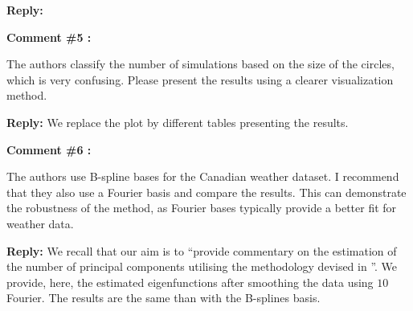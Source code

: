 \documentclass[11pt]{article}
\begin{document}
\medskip

\normalfont

\textbf{Reply:}



\bigskip

\itshape



\textbf{Comment \#5 :}

The authors classify the number of simulations based on the size of the circles, which is very confusing. Please present the results using a clearer visualization method.

\medskip

\normalfont

\textbf{Reply:} We replace the plot by different tables presenting the results.


\bigskip


\itshape

\textbf{Comment \#6 :}

The authors use B-spline bases for the Canadian weather dataset. I recommend that they also use a Fourier basis and compare the results. This can demonstrate the robustness of the method, as Fourier bases typically provide a better fit for weather data.


\medskip

\normalfont

\textbf{Reply:} We recall that our aim is to ``provide commentary on the estimation of the number of principal components utilising the methodology devised in \cite{happMultivariateFunctionalPrincipal2018}''. We provide, here, the estimated eigenfunctions after smoothing the data using $10$ Fourier. The results are the same than with the B-splines basis. 
\end{document}

